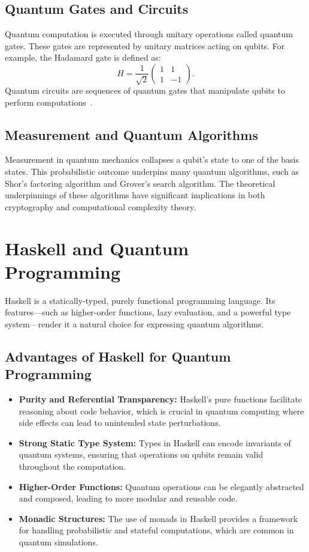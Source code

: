 \documentclass[12pt]{article}
\begin{document}
\subsection{Quantum Gates and Circuits}
Quantum computation is executed through unitary operations called quantum gates. These gates are represented by unitary matrices acting on qubits. For example, the Hadamard gate is defined as:
\[
H = \frac{1}{\sqrt{2}}
\begin{pmatrix}
1 & 1 \\
1 & -1
\end{pmatrix}.
\]
Quantum circuits are sequences of quantum gates that manipulate qubits to perform computations~\cite{nielsen2000quantum}.

\subsection{Measurement and Quantum Algorithms}
Measurement in quantum mechanics collapses a qubit's state to one of the basis states. This probabilistic outcome underpins many quantum algorithms, such as Shor's factoring algorithm and Grover's search algorithm. The theoretical underpinnings of these algorithms have significant implications in both cryptography and computational complexity theory.

\section{Haskell and Quantum Programming}
\label{sec:haskell}
Haskell is a statically-typed, purely functional programming language. Its features---such as higher-order functions, lazy evaluation, and a powerful type system---render it a natural choice for expressing quantum algorithms.

\subsection{Advantages of Haskell for Quantum Programming}
\begin{itemize}
    \item \textbf{Purity and Referential Transparency:} Haskell's pure functions facilitate reasoning about code behavior, which is crucial in quantum computing where side effects can lead to unintended state perturbations.
    \item \textbf{Strong Static Type System:} Types in Haskell can encode invariants of quantum systems, ensuring that operations on qubits remain valid throughout the computation.
    \item \textbf{Higher-Order Functions:} Quantum operations can be elegantly abstracted and composed, leading to more modular and reusable code.
    \item \textbf{Monadic Structures:} The use of monads in Haskell provides a framework for handling probabilistic and stateful computations, which are common in quantum simulations.
\end{itemize}
\end{document}
